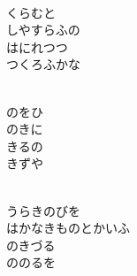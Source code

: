 \documentclass[10pt,b5j]{tarticle} %
\begin{document}
\vspace{1.5em} %
\newcommand{\linespace}{0.5em} %
\newcommand{\blocksize}{0.5\hsize} %
\newcommand{\itemmargin}{3em} %
\begin{enumerate} %
    \setlength{\itemindent}{\itemmargin} %
    \begin{minipage}[c]{\blocksize}
    
        \vspace{\linespace}
        \item~\\
        くらむと\\
        しやすらふの\\
        はにれつつ\\
        つくろふかな
        
    \end{minipage}
    \begin{minipage}[c]{\blocksize}
        
        \vspace{\linespace}
        \item~\\
        のをひ\\
        のきに\\
        きるの\\
        きずや
        
    \end{minipage}
    \begin{minipage}[c]{\blocksize}
        
        \vspace{\linespace}
        \item~\\
        うらきのびを\\
        はかなきものとかいふ\\
        のきづる\\
        ののるを
        
    \end{minipage}
    \begin{minipage}[c]{\blocksize}
        

\end{minipage}
\end{enumerate}
\end{document}
